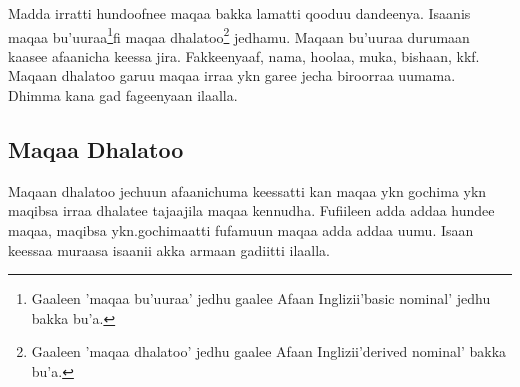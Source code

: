 \documentclass[11pt,b5paper]{book}
\begin{document}
Madda irratti hundoofnee maqaa bakka lamatti qooduu dandeenya. Isaanis maqaa bu'uuraa\footnote{Gaaleen 'maqaa bu'uuraa' jedhu gaalee Afaan Inglizii'basic nominal' jedhu bakka bu'a.}fi maqaa dhalatoo\footnote{Gaaleen 'maqaa dhalatoo' jedhu gaalee Afaan Inglizii'derived nominal' bakka bu'a.} jedhamu. Maqaan bu’uuraa durumaan kaasee afaanicha keessa jira. Fakkeenyaaf, nama, hoolaa, muka, bishaan, kkf. Maqaan dhalatoo garuu maqaa irraa ykn garee jecha biroorraa uumama. Dhimma kana gad fageenyaan ilaalla.

\subsection{Maqaa Dhalatoo}

Maqaan dhalatoo jechuun afaanichuma keessatti kan maqaa ykn gochima ykn maqibsa irraa dhalatee tajaajila maqaa kennudha. Fufiileen adda addaa hundee maqaa, maqibsa ykn.gochimaatti fufamuun maqaa adda addaa uumu. Isaan keessaa muraasa isaanii akka armaan gadiitti ilaalla.\\
\end{document}
